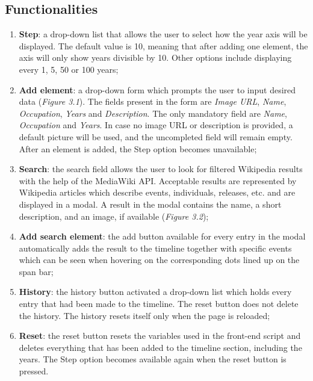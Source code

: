 \documentclass{report}
\begin{document}
\subsection {Functionalities}
\begin{enumerate}
  \item \textbf{Step}: a drop-down list that allows the user to select how the year axis will be displayed. The default value is 10, meaning that after adding one element, the axis will only show years divisible by 10. Other options include displaying every 1, 5, 50 or 100 years;
  \item \textbf{Add element}: a drop-down form which prompts the user to input desired data (\textit{Figure 3.1}). The fields present in the form are \textit{Image URL}, \textit{Name}, \textit{Occupation}, \textit{Years} and \textit{Description}. The only mandatory field are \textit{Name}, \textit{Occupation} and \textit{Years}. In case no image URL or description is provided, a default picture will be used, and the uncompleted field will remain empty. After an element is added, the Step option becomes unavailable;

  \item \textbf{Search}: the search field allows the user to look for filtered Wikipedia results with the help of the MediaWiki API. Acceptable results are represented by Wikipedia articles which describe events, individuals, releases, etc. and are displayed in a modal. A result in the modal contains the name, a short description, and an image, if available (\textit{Figure 3.2});

  \item \textbf{Add search element}: the add button available for every entry in the modal automatically adds the result to the timeline together with specific events which can be seen when hovering on the corresponding dots lined up on the span bar;

  \item \textbf{History}: the history button activated a drop-down list which holds every entry that had been made to the timeline. The reset button does not delete the history. The history resets itself only when the page is reloaded;

  \item \textbf{Reset}: the reset button resets the variables used in the front-end script and deletes everything that has been added to the timeline section, including the years. The Step option becomes available again when the reset button is pressed.
\end{enumerate}
\end{document}
